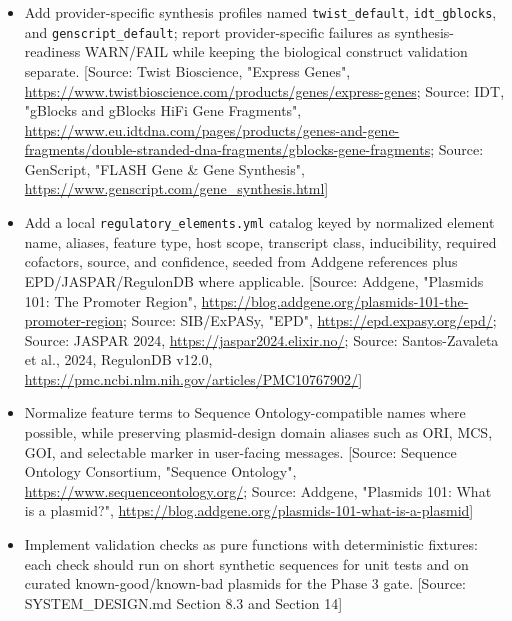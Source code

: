 \documentclass[11pt]{report}
\begin{document}
\begin{itemize}
\item Add provider-specific synthesis profiles named \texttt{twist\_default}, \texttt{idt\_gblocks}, and \texttt{genscript\_default}; report provider-specific failures as synthesis-readiness WARN/FAIL while keeping the biological construct validation separate. [Source: Twist Bioscience, "Express Genes", \url{https://www.twistbioscience.com/products/genes/express-genes}; Source: IDT, "gBlocks and gBlocks HiFi Gene Fragments", \url{https://www.eu.idtdna.com/pages/products/genes-and-gene-fragments/double-stranded-dna-fragments/gblocks-gene-fragments}; Source: GenScript, "FLASH Gene \& Gene Synthesis", \url{https://www.genscript.com/gene_synthesis.html}]
\item Add a local \texttt{regulatory\_elements.yml} catalog keyed by normalized element name, aliases, feature type, host scope, transcript class, inducibility, required cofactors, source, and confidence, seeded from Addgene references plus EPD/JASPAR/RegulonDB where applicable. [Source: Addgene, "Plasmids 101: The Promoter Region", \url{https://blog.addgene.org/plasmids-101-the-promoter-region}; Source: SIB/ExPASy, "EPD", \url{https://epd.expasy.org/epd/}; Source: JASPAR 2024, \url{https://jaspar2024.elixir.no/}; Source: Santos-Zavaleta et al., 2024, RegulonDB v12.0, \url{https://pmc.ncbi.nlm.nih.gov/articles/PMC10767902/}]
\item Normalize feature terms to Sequence Ontology-compatible names where possible, while preserving plasmid-design domain aliases such as ORI, MCS, GOI, and selectable marker in user-facing messages. [Source: Sequence Ontology Consortium, "Sequence Ontology", \url{https://www.sequenceontology.org/}; Source: Addgene, "Plasmids 101: What is a plasmid?", \url{https://blog.addgene.org/plasmids-101-what-is-a-plasmid}]
\item Implement validation checks as pure functions with deterministic fixtures: each check should run on short synthetic sequences for unit tests and on curated known-good/known-bad plasmids for the Phase 3 gate. [Source: SYSTEM\_DESIGN.md Section 8.3 and Section 14]
\end{itemize}
\end{document}
